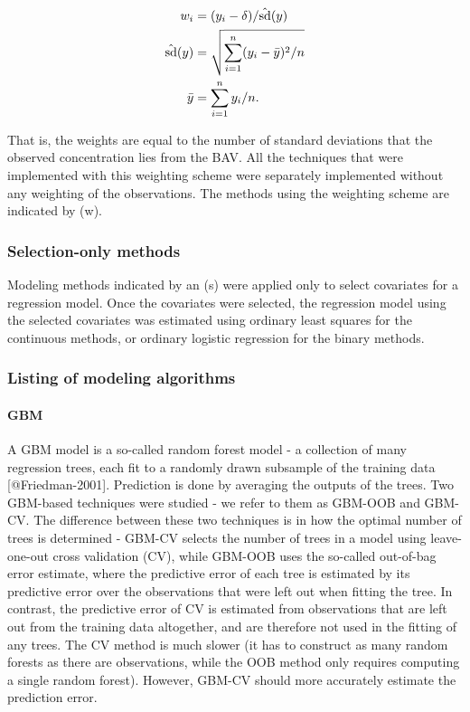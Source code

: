\[
    \begin{aligned}
        w_i &= (y_i - \delta) / \hat{\rm{sd}}(y)\\
        \hat{\rm{sd}}(y) &= \sqrt{\sum_{i=1}^n (y_i - \bar{y})^2 / n}\\
        \bar{y} &= \sum_{i=1}^n y_i / n.
    \end{aligned}
\]

That is, the weights are equal to the number of standard deviations that
the observed concentration lies from the BAV. All the techniques that
were implemented with this weighting scheme were separately implemented
without any weighting of the observations. The methods using the
weighting scheme are indicated by (w).

\subsubsection{Selection-only methods}\label{selection-only-methods}

Modeling methods indicated by an (s) were applied only to select
covariates for a regression model. Once the covariates were selected,
the regression model using the selected covariates was estimated using
ordinary least squares for the continuous methods, or ordinary logistic
regression for the binary methods.

\subsubsection{Listing of modeling
algorithms}\label{listing-of-modeling-algorithms}

\paragraph{GBM}\label{gbm}

A GBM model is a so-called random forest model - a collection of many
regression trees, each fit to a randomly drawn subsample of the training
data {[}@Friedman-2001{]}. Prediction is done by averaging the outputs
of the trees. Two GBM-based techniques were studied - we refer to them
as GBM-OOB and GBM-CV. The difference between these two techniques is in
how the optimal number of trees is determined - GBM-CV selects the
number of trees in a model using leave-one-out cross validation (CV),
while GBM-OOB uses the so-called out-of-bag error estimate, where the
predictive error of each tree is estimated by its predictive error over
the observations that were left out when fitting the tree. In contrast,
the predictive error of CV is estimated from observations that are left
out from the training data altogether, and are therefore not used in the
fitting of any trees. The CV method is much slower (it has to construct
as many random forests as there are observations, while the OOB method
only requires computing a single random forest). However, GBM-CV should
more accurately estimate the prediction error.

